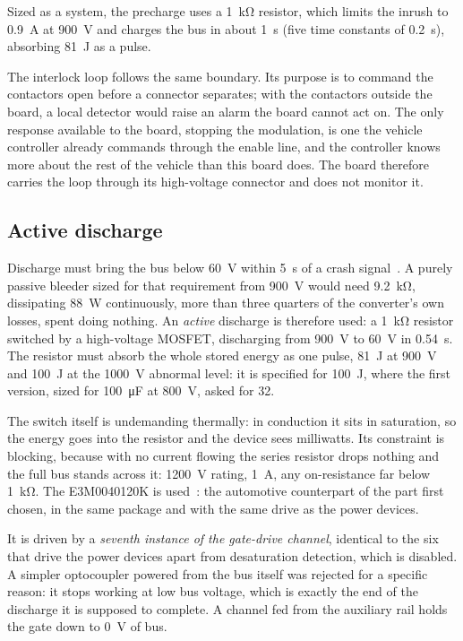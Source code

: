 Sized as a system, the precharge uses a \SI{1}{\kilo\ohm} resistor, which
limits the inrush to \SI{0.9}{\ampere} at \SI{900}{\volt} and charges the
bus in about \SI{1}{\second} (five time constants of
\SI{0.2}{\second}), absorbing \SI{81}{\joule} as a pulse.

The interlock loop follows the same boundary. Its purpose is to command the
contactors open before a connector separates; with the contactors outside
the board, a local detector would raise an alarm the board cannot act on.
The only response available to the board, stopping the modulation, is one
the vehicle controller already commands through the enable line, and the
controller knows more about the rest of the vehicle than this board does. The board therefore carries the
loop through its high-voltage connector and does not monitor it.

\subsection{Active discharge}

Discharge must bring the bus below \SI{60}{\volt} within \SI{5}{\second} of
a crash signal~\cite{unr100,iso6469}. A purely passive bleeder sized for
that requirement from \SI{900}{\volt} would need \SI{9.2}{\kilo\ohm},
dissipating \SI{88}{\watt} continuously, more than three quarters of the
converter's own losses, spent doing nothing. An \emph{active} discharge is
therefore used: a \SI{1}{\kilo\ohm} resistor switched by a high-voltage
MOSFET, discharging from \SI{900}{\volt} to \SI{60}{\volt} in
\SI{0.54}{\second}. The resistor must absorb the whole stored energy as one
pulse, \SI{81}{\joule} at \SI{900}{\volt} and \SI{100}{\joule} at the
\SI{1000}{\volt} abnormal level: it is specified for
\SI{100}{\joule}, where the first version, sized for \SI{100}{\micro\farad}
at \SI{800}{\volt}, asked for \SI{32}{}.

The switch itself is undemanding thermally: in conduction it sits in
saturation, so the energy goes into the resistor and the device sees
milliwatts. Its constraint is blocking, because with no current
flowing the series resistor drops nothing and the full bus stands across it:
\SI{1200}{\volt} rating, \SI{1}{\ampere}, any on-resistance far below
\SI{1}{\kilo\ohm}. The E3M0040120K is used~\cite{wolfspeed_e3m0040}: the
automotive counterpart of the part first chosen, in the same package and
with the same drive as the power devices.

It is driven by a \emph{seventh instance of the gate-drive channel},
identical to the six that drive the power devices apart from desaturation
detection, which is disabled. A simpler optocoupler powered from the bus
itself was rejected for a specific reason: it stops working at low bus
voltage, which is exactly the end of the discharge it is supposed to
complete. A channel fed from the auxiliary rail holds the gate down to
\SI{0}{\volt} of bus.

